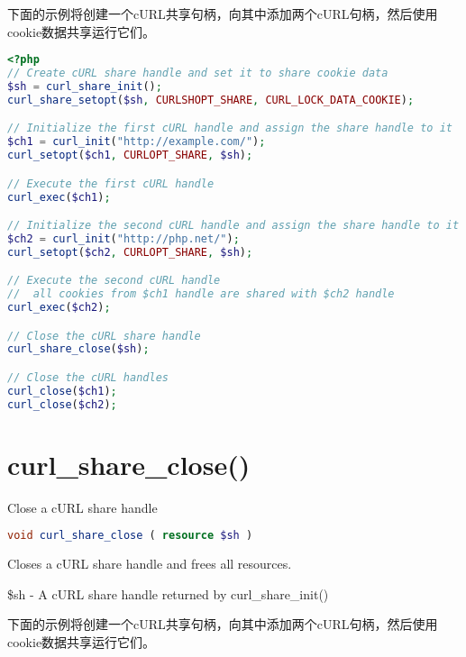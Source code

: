 下面的示例将创建一个cURL共享句柄，向其中添加两个cURL句柄，然后使用cookie数据共享运行它们。

\begin{lstlisting}[language=PHP]
<?php
// Create cURL share handle and set it to share cookie data
$sh = curl_share_init();
curl_share_setopt($sh, CURLSHOPT_SHARE, CURL_LOCK_DATA_COOKIE);

// Initialize the first cURL handle and assign the share handle to it
$ch1 = curl_init("http://example.com/");
curl_setopt($ch1, CURLOPT_SHARE, $sh);

// Execute the first cURL handle
curl_exec($ch1);

// Initialize the second cURL handle and assign the share handle to it
$ch2 = curl_init("http://php.net/");
curl_setopt($ch2, CURLOPT_SHARE, $sh);

// Execute the second cURL handle
//  all cookies from $ch1 handle are shared with $ch2 handle
curl_exec($ch2);

// Close the cURL share handle
curl_share_close($sh);

// Close the cURL handles
curl_close($ch1);
curl_close($ch2);
\end{lstlisting}

\section{curl\_share\_close()}


Close a cURL share handle


\begin{lstlisting}[language=PHP]
void curl_share_close ( resource $sh )
\end{lstlisting}

Closes a cURL share handle and frees all resources.

\begin{compactitem}
\item \$sh - A cURL share handle returned by curl\_share\_init()
\end{compactitem}

下面的示例将创建一个cURL共享句柄，向其中添加两个cURL句柄，然后使用cookie数据共享运行它们。


